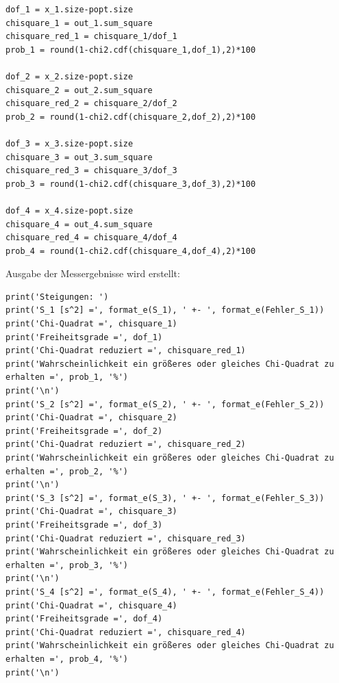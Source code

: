 \documentclass[a4paper,10pt]{article}
\begin{document}
\begin{lstlisting}
dof_1 = x_1.size-popt.size
chisquare_1 = out_1.sum_square
chisquare_red_1 = chisquare_1/dof_1
prob_1 = round(1-chi2.cdf(chisquare_1,dof_1),2)*100

dof_2 = x_2.size-popt.size
chisquare_2 = out_2.sum_square
chisquare_red_2 = chisquare_2/dof_2
prob_2 = round(1-chi2.cdf(chisquare_2,dof_2),2)*100

dof_3 = x_3.size-popt.size
chisquare_3 = out_3.sum_square
chisquare_red_3 = chisquare_3/dof_3
prob_3 = round(1-chi2.cdf(chisquare_3,dof_3),2)*100

dof_4 = x_4.size-popt.size
chisquare_4 = out_4.sum_square
chisquare_red_4 = chisquare_4/dof_4
prob_4 = round(1-chi2.cdf(chisquare_4,dof_4),2)*100

\end{lstlisting}

Ausgabe der Messergebnisse wird erstellt:\begin{lstlisting}
print('Steigungen: ')
print('S_1 [s^2] =', format_e(S_1), ' +- ', format_e(Fehler_S_1))
print('Chi-Quadrat =', chisquare_1)
print('Freiheitsgrade =', dof_1)
print('Chi-Quadrat reduziert =', chisquare_red_1)
print('Wahrscheinlichkeit ein größeres oder gleiches Chi-Quadrat zu erhalten =', prob_1, '%')
print('\n')
print('S_2 [s^2] =', format_e(S_2), ' +- ', format_e(Fehler_S_2))
print('Chi-Quadrat =', chisquare_2)
print('Freiheitsgrade =', dof_2)
print('Chi-Quadrat reduziert =', chisquare_red_2)
print('Wahrscheinlichkeit ein größeres oder gleiches Chi-Quadrat zu erhalten =', prob_2, '%')
print('\n')
print('S_3 [s^2] =', format_e(S_3), ' +- ', format_e(Fehler_S_3))
print('Chi-Quadrat =', chisquare_3)
print('Freiheitsgrade =', dof_3)
print('Chi-Quadrat reduziert =', chisquare_red_3)
print('Wahrscheinlichkeit ein größeres oder gleiches Chi-Quadrat zu erhalten =', prob_3, '%')
print('\n')
print('S_4 [s^2] =', format_e(S_4), ' +- ', format_e(Fehler_S_4))
print('Chi-Quadrat =', chisquare_4)
print('Freiheitsgrade =', dof_4)
print('Chi-Quadrat reduziert =', chisquare_red_4)
print('Wahrscheinlichkeit ein größeres oder gleiches Chi-Quadrat zu erhalten =', prob_4, '%')
print('\n')
\end{lstlisting}
\end{document}
